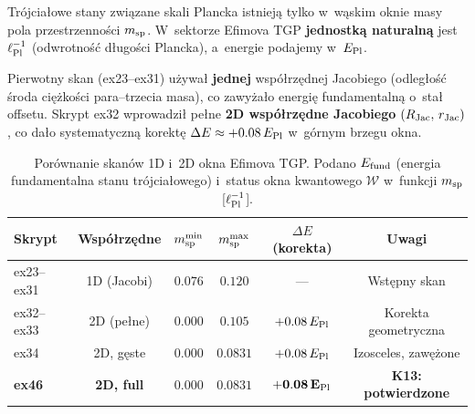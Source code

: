 Tr\'ojcia\l{}owe stany zwi\k{a}zane skali Plancka istniej\k{a} tylko w~w\k{a}skim
oknie masy pola przestrzenno\'sci $m_{\rm sp}$.
W~sektorze Efimova TGP \textbf{jednostk\k{a} naturaln\k{a}} jest $\ell_{\rm Pl}^{-1}$
(odwrotno\'s\'c d\l{}ugo\'sci Plancka), a~energie podajemy w~$E_{\rm Pl}$.

\begin{remark}%
\label{rem:jacobi-2d-correction}
Pierwotny skan (ex23--ex31) u\.zywa\l{} \textbf{jednej} wsp\'o\l{}rz\k{e}dnej Jacobiego
(odleg\l{}o\'s\'c \'sroda ci\k{e}\.zko\'sci para--trzecia masa),
co zawy\.za\l{}o energi\k{e} fundamentaln\k{a} o~sta\l{} offsetu.
Skrypt ex32 wprowadzi\l{} pe\l{}ne \textbf{2D wsp\'o\l{}rz\k{e}dne Jacobiego}
$(R_{\rm Jac},\, r_{\rm Jac})$, co da\l{}o systematyczn\k{a} korekt\k{e}
$\Delta E \approx +0.08\,E_{\rm Pl}$ w~g\'ornym brzegu okna.
\end{remark}

\begin{table}[ht]
\caption{Por\'ownanie skan\'ow 1D i~2D okna Efimova TGP.
Podano $E_{\rm fund}$ (energia fundamentalna stanu tr\'ojcia\l{}owego)
i~status okna kwantowego $\mathcal{W}$
w~funkcji $m_{\rm sp}$ [$\ell_{\rm Pl}^{-1}$].}
\label{tab:efimov-1d-vs-2d}
\begin{center}
\begin{tabular}{@{}lccccc@{}}
\toprule
Skrypt & Wsp\'o\l{}rz\k{e}dne & $m_{\rm sp}^{\rm min}$ &
  $m_{\rm sp}^{\rm max}$ & $\Delta E$ (korekta) & Uwagi \\
\midrule
ex23--ex31 & 1D (Jacobi) & $0.076$ & $0.120$ & --- & Wst\k{e}pny skan \\
ex32--ex33 & 2D (pe\l{}ne) & $0.000$ & $0.105$ & $+0.08\,E_{\rm Pl}$ & Korekta geometryczna \\
ex34 & 2D, g\k{e}ste & $0.000$ & $0.0831$ & $+0.08\,E_{\rm Pl}$ & Izosceles, zaw\k{e}\.zone \\
\textbf{ex46} & \textbf{2D, full} & $\mathbf{0.000}$ & $\mathbf{0.0831}$ &
  $\mathbf{+0.08\,E_{\rm Pl}}$ & \textbf{K13: potwierdzone} \\
\bottomrule
\end{tabular}
\end{center}
\end{table}


